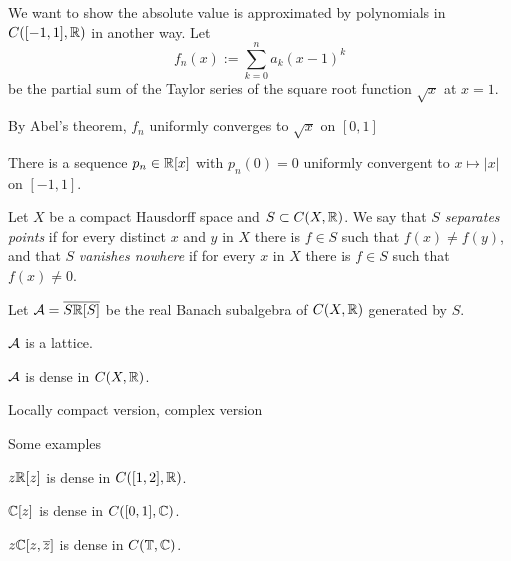 \documentclass{../../large}
\begin{document}
\begin{prb}
We want to show the absolute value is approximated by polynomials in $C([-1,1],\mathbb{R})$ in another way.
Let
\[f_n(x):=\sum_{k=0}^n a_k(x-1)^k\]
be the partial sum of the Taylor series of the square root function $\sqrt x$ at $x=1$.
\begin{parts}
\item By Abel's theorem, $f_n$ uniformly converges to $\sqrt x$ on $[0,1]$
\item There is a sequence $p_n\in\mathbb{R}[x]$ with $p_n(0)=0$ uniformly convergent to $x\mapsto|x|$ on $[-1,1]$.
\end{parts}
\end{prb}


\begin{prb}
Let $X$ be a compact Hausdorff space and $S\subset C(X,\mathbb{R})$.
We say that $S$ \emph{separates points} if for every distinct $x$ and $y$ in $X$ there is $f\in S$ such that $f(x)\ne f(y)$, and that $S$ \emph{vanishes nowhere} if for every $x$ in $X$ there is $f\in S$ such that $f(x)\ne0$.

Let $\mathcal{A}=\overline{S\mathbb{R}[S]}$ be the real Banach subalgebra of $C(X,\mathbb{R})$ generated by $S$.
\begin{parts}
\item $\mathcal{A}$ is a lattice.
\item $\mathcal{A}$ is dense in $C(X,\mathbb{R})$.
\end{parts}
\end{prb}




Locally compact version,
complex version








\begin{prb}
Some examples
\begin{parts}
\item $z\mathbb{R}[z]$ is dense in $C([1,2],\mathbb{R})$.
\item $\mathbb{C}[z]$ is dense in $C([0,1],\mathbb{C})$.
\item $z\mathbb{C}[z,\overline z]$ is dense in $C(\mathbb{T},\mathbb{C})$.
\end{parts}
\end{prb}
\end{document}

